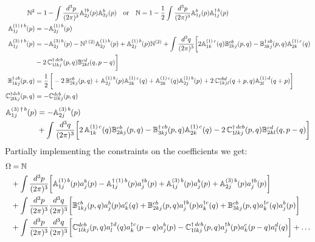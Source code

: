 \documentclass[aps,prd,amsmath,amssymb,nofootinbib]{revtex4-2}
\def\mf#1{\mathbb{#1}}
\numberwithin{equation}{section}
\begin{document}
\begin{align}
 \mf{N}^{2}  &= 1-  \int \frac{d^{3}p}{(2\pi)^{3}} \mf{A}^{\dagger b}_{2j}(p) \mf{A}^{b}_{2j}(p) \quad
 \text{or} \quad \mf{N}   = 1- \frac{1}{2} \int \frac{d^{3}p}{(2\pi)^{3}} \mf{A}^{b}_{1j}(p) \mf{A}^{\dagger\, b}_{1j}(p) \\ 
 \mf{A}^{(1)\, \dagger\,  b}_{1j}(p) & =  -\mf{A}^{(1)\, b}_{2j}(p) \\  
 \mf{A}^{(3)\, \dagger\, b}_{1j}(p) & = -\mf{A}^{(3)\, b}_{2j}(p)- \mf{N}^{\dagger\, (2)}\mf{A}^{(1)\, b}_{2j}(p) + \mf{A}^{(1)\, b}_{2j}(p)\mf{N}^{(2)} +\int \frac{d^{3}q}{(2\pi)^{3}}\bigg[2\mf{A}^{(1)\, c}_{1k}(q)\mf{B}^{cb}_{2kj}(p,q)-\mf{B}^{\dagger\, cb}_{3kj}(p,q)\mf{A}^{(1)\,c}_{2k}(q)\notag \\ & -2\,\mf{C}^{\dagger\, dcb}_{1lkj}(p,q)\mf{B}^{cd}_{2kl}(q,p-q)\bigg] \\ 
 \mf{B}^{\dagger\, cb}_{1kj}(p,q) & = \frac{1}{2}\,\bigg[-2\,\mf{B}^{cb}_{2kj}(p,q)+\mf{A}^{(1)\, b}_{2j}(p)\mf{A}^{(1)\, c}_{2k}(q)+ \mf{A}^{(1)\, c}_{2k}(q)\mf{A}^{(1)\, b}_{2j}(p)+2\, \mf{C}^{cbd}_{1kjl}(q+p,q)\mf{A}^{(1)\,d}_{2l}(q+p)\bigg]\\ \mf{C}^{\dagger dcb}_{2lkj}(p,q) & =  -\mf{C}^{dcb}_{1lkj}(p,q)
\end{align}
\begin{align}
 \mf{A}^{(3)\, \dagger\, b}_{1j}(p) & = -\mf{A}^{(3)\, b}_{2j}(p) \notag \\ & +\int \frac{d^{3}q}{(2\pi)^{3}}\bigg[2\, \mf{A}^{(1)\, c}_{1k}(q)\mf{B}^{cb}_{2kj}(p,q)-\mf{B}^{\dagger\, cb}_{3kj}(p,q)\mf{A}^{(1)\,c}_{2k}(q)-2\,\mf{C}^{\dagger\, dcb}_{1lkj}(p,q)\mf{B}^{cd}_{2kl}(q,p-q)\bigg]
 \end{align}
 Partially implementing the constraints on the coefficients we get:
\begin{align}
    \Omega  & = \mf{N}  \notag \\ & +
                \int \frac{d^3p}{(2\pi)^3} 
                \bigg[ 
                   \mf{A}^{(1)\, b}_{1j}(p)a^{b}_{j}(p) 
                -  \mf{A}^{\dagger\, (1)\, b}_{1j} (p) a^{\dagger b}_{j}(p)+ \mf{A}^{(3)\, b}_{1j}(p)a^{b}_{j}(p) 
                +  \mf{A}^{(3)\, b}_{2j} (p) a^{\dagger b}_{j}(p)\bigg] \notag \\ & 
               +\int \frac{d^3p}{(2\pi)^3} \frac{d^3q}{(2\pi)^3} 
               \bigg[\mf{B}^{cb}_{1kj}(p,q) a^{b}_{j}(p)a^{c}_{k}(q) 
                   + \mf{B}^{cb}_{2kj}(p,q) a^{\dagger b}_{j}(p)a^{\dagger c}_{k}(q)
               + \mf{B}^{cb}_{3kj} (p,q) a^{\dagger c}_{k}(q)a^{b}_{j}(p)
               \bigg] \notag \\ & 
               + \int 
               \frac{d^3p}{(2\pi)^3} \frac{d^3q}{(2\pi)^3} 
               \bigg[
                \mf{C}^{ dcb}_{1lkj}(p,q) a^{\dagger d}_{l}(q)  a^{\dagger c}_{k}(p-q)  a^{b}_{j}(p)
               - \mf{C}^{\dagger\, dcb}_{1lkj}(p,q) a^{\dagger b}_{j}(p) a^{c}_{k}(p-q) a^{d}_{l}(q)\bigg] +\ldots
\end{align}
\end{document}
